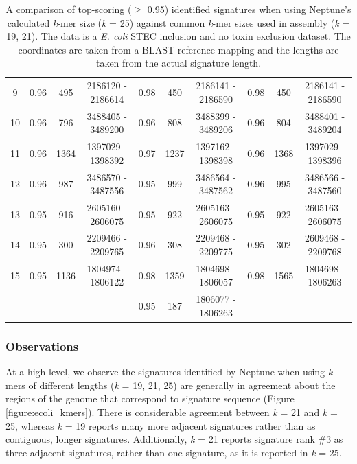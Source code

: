 \documentclass[a4paper,10pt]{article}
\begin{document}
\begin{landscape}
\begin{table}[!h]
\begin{tabular}{| c | c c c | c c c | c c c |}
  9 & 0.96 & 495 & 2186120 - 2186614 & 0.98 & 450 & 2186141 - 2186590 & 0.98 & 450 & 2186141 - 2186590 \\ \cline{1-10}
  10 & 0.96 & 796 & 3488405 - 3489200 & 0.96 & 808 & 3488399 - 3489206 & 0.96 & 804 & 3488401 - 3489204 \\ \cline{1-10}
  11 & 0.96 & 1364 & 1397029 - 1398392 & 0.97 & 1237 & 1397162 - 1398398 & 0.96 & 1368 & 1397029 - 1398396 \\ \cline{1-10}
  12 & 0.96 & 987 & 3486570 - 3487556 & 0.95 & 999 & 3486564 - 3487562 & 0.96 & 995 & 3486566 - 3487560 \\ \cline{1-10}
  13 & 0.95 & 916 & 2605160 - 2606075 & 0.95 & 922 & 2605163 - 2606075 & 0.95 & 922 & 2605163 - 2606075 \\ \cline{1-10}
  14 & 0.95 & 300 & 2209466 - 2209765 & 0.96 & 308 & 2209468 - 2209775 & 0.95 & 302 & 2609468 - 2209768 \\ \cline{1-10}
  15 & 0.95 & 1136 & 1804974 - 1806122 & 0.98 & 1359 & 1804698 - 1806057 & 0.98 & 1565 & 1804698 - 1806263 \\
  & & & & 0.95 & 187 & 1806077 - 1806263 & & & \\ \cline{1-10}
\end{tabular}%
\caption{A comparison of top-scoring (\(\geq\) 0.95) identified signatures when using Neptune's calculated \textit{k}-mer size (\textit{k} = 25) against common \textit{k}-mer sizes used in assembly (\textit{k} = 19, 21). The data is a \textit{E. coli} STEC inclusion and no toxin exclusion dataset. The coordinates are taken from a BLAST reference mapping and the lengths are taken from the actual signature length.}
\label{table:ecoli_kmers}
\end{table}
\vfill
\end{landscape}

\subsubsection*{Observations}

At a high level, we observe the signatures identified by Neptune when using \textit{k}-mers of different lengths (\textit{k} = 19, 21, 25) are generally in agreement about the regions of the genome that correspond to signature sequence (Figure \ref{figure:ecoli_kmers}). There is considerable agreement between \textit{k} = 21 and \textit{k} = 25, whereas \textit{k} = 19 reports many more adjacent signatures rather than as contiguous, longer signatures. Additionally, \textit{k} = 21 reports signature rank \#3 as three adjacent signatures, rather than one signature, as it is reported in \textit{k} = 25.
\end{document}
